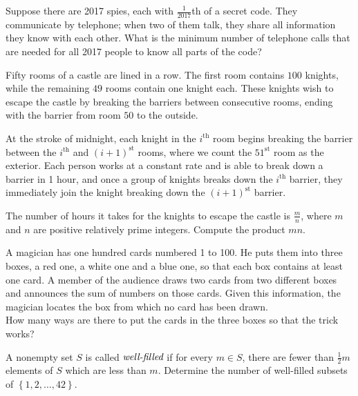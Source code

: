 \documentclass{article}
\begin{document}
\begin{prob}[BMT 2018]{3}
Suppose there are 2017 spies, each with $\frac{1}{2017}$th of a secret code. They communicate by telephone; when two of them talk, they share all information they know with each other. What is the minimum number of telephone calls that are needed for all 2017 people to know all parts of the
code?
\end{prob}

\begin{prob}{3}
Fifty rooms of a castle are lined in a row.  The first room contains $100$ knights, while the remaining $49$ rooms contain one knight each.  These knights wish to escape the castle by breaking the barriers between consecutive rooms, ending with the barrier from room $50$ to the outside.

\noindent At the stroke of midnight, each knight in the $i^{\text{th}}$ room begins breaking the barrier between the $i^{\text{th}}$ and $(i+1)^{\text{st}}$ rooms, where we count the $51^{\text{st}}$ room as the exterior.  Each person works at a constant rate and is able to break down a barrier in 1 hour, and once a group of knights breaks down the $i^{\text{th}}$ barrier, they immediately join the knight breaking down the $(i+1)^{\text{st}}$ barrier.

\noindent The number of hours it takes for the knights to escape the castle is $\tfrac mn$, where $m$ and $n$ are positive relatively prime integers.  Compute the product $mn$.
\end{prob}

\begin{prob}[IMO 2000/4]{9}
A magician has one hundred cards numbered 1 to 100. He puts them into three boxes, a red one, a white one and a blue one, so that each box contains at least one card. A member of the audience draws two cards from two different boxes and announces the sum of numbers on those cards. Given this information, the magician locates the box from which no card has been drawn.\\[1\baselineskip]How many ways are there to put the cards in the three boxes so that the trick works?
\end{prob}

\begin{prob}[HMMT 2016 T6]{13}
A nonempty set $S$ is called $\emph{well-filled}$ if for every $m \in S$, there are fewer than $\frac 12 m$ elements of $S$ which are less than $m$. Determine the number of well-filled subsets of $\left\{ 1,2,\dots,42 \right\}$.
\end{prob}
\end{document}
